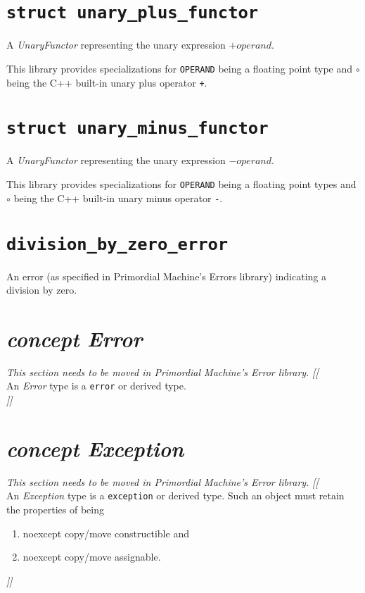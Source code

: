 \documentclass[oneside]{book}
\begin{document}
\section{\texttt{struct unary\_plus\_functor}}
A \textit{UnaryFunctor} representing the unary expression $+\textit{operand}$.\newline

\noindent{}This library provides specializations for \texttt{OPERAND} being a floating point type
and $\circ$ being the C++ built-in unary plus operator \texttt{+}.

\section{\texttt{struct unary\_minus\_functor}}
A \textit{UnaryFunctor} representing the unary expression $-\textit{operand}$.\newline

\noindent{}This library provides specializations for \texttt{OPERAND} being a floating point types
and $\circ$ being the C++ built-in unary minus operator \texttt{-}.

\section{\texttt{division\_by\_zero\_error}}
An error (as specified in Primordial Machine's Errors library) indicating a division by zero.

\section{\textit{concept Error}}
\textit{\color{orange}This section needs to be moved in Primordial Machine's Error library.}
\noindent\textit{\color{orange}[[}\\
An \textit{Error} type is a \texttt{error} or derived type.\\
\noindent\textit{\color{orange}]]}

\section{\textit{concept Exception}}
\textit{\color{orange}This section needs to be moved in Primordial Machine's Error library.}
\noindent\textit{\color{orange}[[}\\
An \textit{Exception} type is a \texttt{exception} or derived type.
Such an object must retain the properties of being
\begin{enumerate}
  \item noexcept copy/move constructible and
  \item noexcept copy/move assignable.
\end{enumerate}
\noindent\textit{\color{orange}]]}
\end{document}
